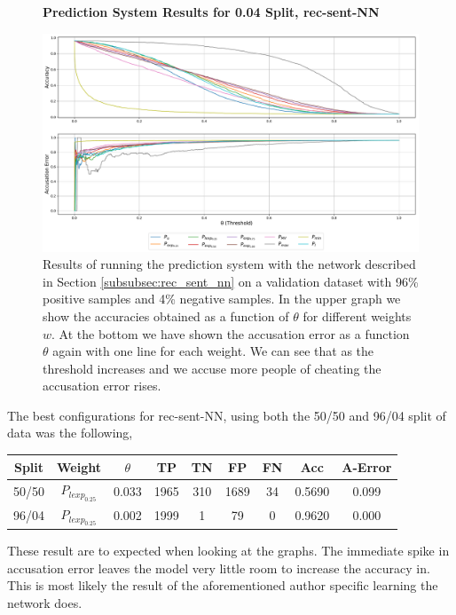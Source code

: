 \begin{figure}
    \centering
    \textbf{Prediction System Results for 0.04 Split, \glsdesc{rec-sent-NN}}\par\medskip
    \includegraphics[scale=0.33]{./pictures/experiments/rec_sent_nn/prediction_system_04}
    \caption{Results of running the prediction system with the network described
        in Section \ref{subsubsec:rec_sent_nn} on a validation dataset
        with 96\% positive samples and 4\% negative samples. In the upper graph
        we show the accuracies obtained as a function of $\theta$ for different
        weights $w$. At the bottom we have shown the accusation error as a
        function $\theta$ again with one line for each weight. We can see that
        as the threshold increases and we accuse more people of cheating the
        accusation error rises.}
    \label{fig:rec-sent-NN-pred-4}
\end{figure}

The best configurations for \gls{rec-sent-NN}, using both the 50/50 and
96/04 split of data was the following,
\begin{center}
\begin{tabular}{|c|c|c|c|c|c|c|c|c|}
\hline
Split & Weight            & $\theta$ & TP  & TN & FP  & FN & Acc    & A-Error \\ \hline
50/50 & $P_{lexp_{0.25}}$ & 0.033    & 1965 & 310 & 1689 & 34  & 0.5690 & 0.099   \\ \hline
96/04 & $P_{lexp_{0.25}}$ & 0.002    & 1999 & 1   & 79   & 0   & 0.9620 & 0.000   \\ \hline
\end{tabular}
\end{center}

These result are to expected when looking at the graphs. The immediate spike in
accusation error leaves the model very little room to increase the accuracy in.
This is most likely the result of the aforementioned author specific learning
the network does.


